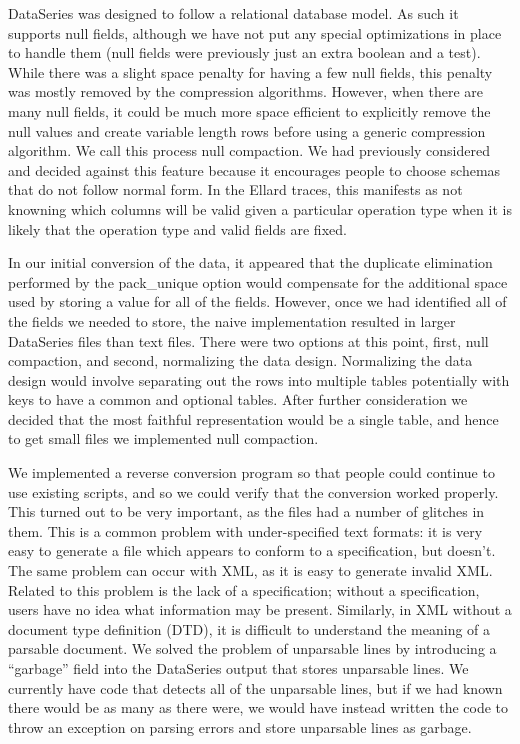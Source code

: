 \documentclass[twocolumn, 11pt]{article}
\begin{document}
DataSeries was designed to follow a relational database model.  As
such it supports null fields, although we have not put any special
optimizations in place to handle them (null fields were previously
just an extra boolean and a test).  While there was a slight space
penalty for having a few null fields, this penalty was mostly removed
by the compression algorithms.  However, when there are many null
fields, it could be much more space efficient to explicitly remove the
null values and create variable length rows before using a generic
compression algorithm.  We call this process null compaction.  We had
previously considered and decided against this feature because it
encourages people to choose schemas that do not follow normal form.
In the Ellard traces, this manifests as not knowning which columns
will be valid given a particular operation type when it is likely that
the operation type and valid fields are fixed.

In our initial conversion of the data, it appeared that the duplicate
elimination performed by the pack\_unique option would compensate for
the additional space used by storing a value for all of the fields.
However, once we had identified all of the fields we needed to store,
the naive implementation resulted in larger DataSeries files than text
files.  There were two options at this point, first, null compaction,
and second, normalizing the data design.  Normalizing the data design
would involve separating out the rows into multiple tables potentially
with keys to have a common and optional tables.  After further
consideration we decided that the most faithful representation would
be a single table, and hence to get small files we implemented null
compaction.

We implemented a reverse conversion program so that people could
continue to use existing scripts, and so we could verify that the
conversion worked properly.  This turned out to be very important, as
the files had a number of glitches in them.  This is a common problem
with under-specified text formats: it is very easy to generate a file
which appears to conform to a specification, but doesn't.  The same
problem can occur with XML, as it is easy to generate invalid XML.
Related to this problem is the lack of a specification; without a
specification, users have no idea what information may be present.
Similarly, in XML without a document type definition (DTD), it is
difficult to understand the meaning of a parsable document.  We solved
the problem of unparsable lines by introducing a ``garbage'' field
into the DataSeries output that stores unparsable lines.  We currently
have code that detects all of the unparsable lines, but if we had
known there would be as many as there were, we would have instead
written the code to throw an exception on parsing errors and store
unparsable lines as garbage.
\end{document}
